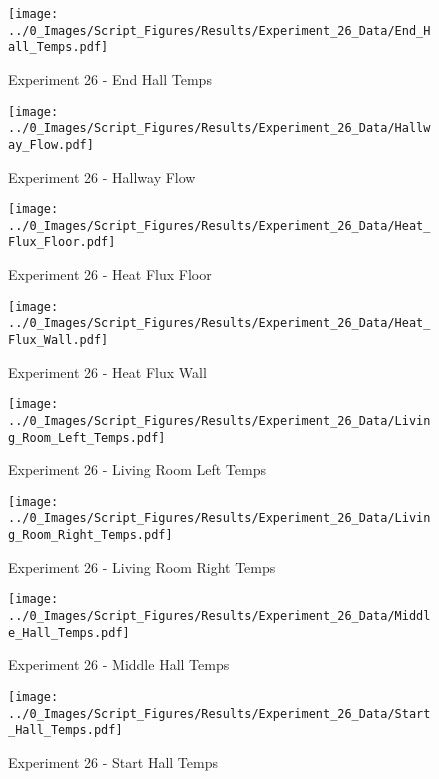 	\clearpage

	\begin{figure}[H]
		\centering
		\texttt{[image: ../0\_Images/Script\_Figures/Results/Experiment\_26\_Data/End\_Hall\_Temps.pdf]}
		\caption[]{Experiment 26 - End Hall Temps}
	\end{figure}
 

	\begin{figure}[H]
		\centering
		\texttt{[image: ../0\_Images/Script\_Figures/Results/Experiment\_26\_Data/Hallway\_Flow.pdf]}
		\caption[]{Experiment 26 - Hallway Flow}
	\end{figure}
 
	\clearpage

	\begin{figure}[H]
		\centering
		\texttt{[image: ../0\_Images/Script\_Figures/Results/Experiment\_26\_Data/Heat\_Flux\_Floor.pdf]}
		\caption[]{Experiment 26 - Heat Flux Floor}
	\end{figure}
 

	\begin{figure}[H]
		\centering
		\texttt{[image: ../0\_Images/Script\_Figures/Results/Experiment\_26\_Data/Heat\_Flux\_Wall.pdf]}
		\caption[]{Experiment 26 - Heat Flux Wall}
	\end{figure}
 
	\clearpage

	\begin{figure}[H]
		\centering
		\texttt{[image: ../0\_Images/Script\_Figures/Results/Experiment\_26\_Data/Living\_Room\_Left\_Temps.pdf]}
		\caption[]{Experiment 26 - Living Room Left Temps}
	\end{figure}
 

	\begin{figure}[H]
		\centering
		\texttt{[image: ../0\_Images/Script\_Figures/Results/Experiment\_26\_Data/Living\_Room\_Right\_Temps.pdf]}
		\caption[]{Experiment 26 - Living Room Right Temps}
	\end{figure}
 
	\clearpage

	\begin{figure}[H]
		\centering
		\texttt{[image: ../0\_Images/Script\_Figures/Results/Experiment\_26\_Data/Middle\_Hall\_Temps.pdf]}
		\caption[]{Experiment 26 - Middle Hall Temps}
	\end{figure}
 

	\begin{figure}[H]
		\centering
		\texttt{[image: ../0\_Images/Script\_Figures/Results/Experiment\_26\_Data/Start\_Hall\_Temps.pdf]}
		\caption[]{Experiment 26 - Start Hall Temps}
	\end{figure}
 
